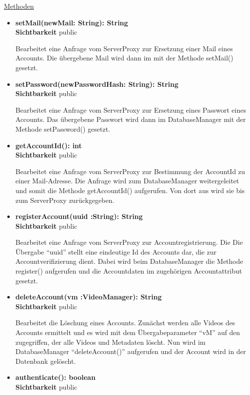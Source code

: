 \underline{Methoden}
\begin{itemize}
\itemsep0pt
\item \textbf{setMail(newMail: String): String}\hfill\\
\textbf{Sichtbarkeit} public

Bearbeitet eine Anfrage vom ServerProxy zur Ersetzung einer Mail eines Accounts. Die übergebene Mail wird dann im  mit der Methode setMail() gesetzt.

\item \textbf{setPassword(newPasswordHash: String): String}\hfill\\
\textbf{Sichtbarkeit} public

Bearbeitet eine Anfrage vom ServerProxy zur Ersetzung eines Passwort eines Accounts. Das übergebene Passwort wird dann im DatabaseManager mit der Methode setPassword() gesetzt.

\item \textbf{getAccountId(): int}\hfill\\
\textbf{Sichtbarkeit} public

Bearbeitet eine Anfrage vom ServerProxy zur Bestimmung der AccountId zu einer Mail-Adresse. Die Anfrage wird zum DatabaseManager weitergeleitet und somit die Methode getAccountId() aufgerufen. Von dort aus wird sie bis zum ServerProxy zurückgegeben.  

\item \textbf{registerAccount(uuid :String): String}\hfill\\
\textbf{Sichtbarkeit} public

Bearbeitet eine Anfrage vom ServerProxy zur Accountregistrierung. Die Die Übergabe ``uuid'' stellt eine eindeutige Id des Accounts dar, die zur Accountverifizierung dient. Dabei wird beim DatabaseManager die Methode register() aufgerufen und die Accountdaten im zugehörigen Accountattribut gesetzt. 

\item \textbf{deleteAccount(vm :VideoManager): String}\hfill\\
\textbf{Sichtbarkeit} public

Bearbeitet die Löschung eines Accounts. Zunächst werden alle Videos des Accounts ermittelt und es wird mit dem Übergabeparameter ``vM'' auf den  zugegriffen, der alle Videos und Metadaten löscht. Nun wird im DatabaseManager ``deleteAccount()'' aufgerufen und der Account wird in der Datenbank gelöscht.

\item \textbf{authenticate(): boolean}\hfill\\
\textbf{Sichtbarkeit} public


\end{itemize}
